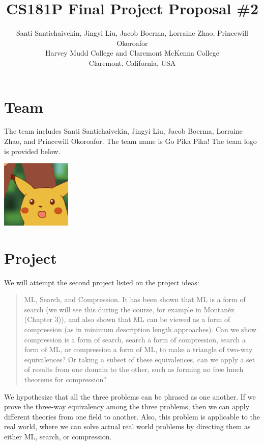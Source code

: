 \documentclass[12pt]{article}
\begin{document}
\title{CS181P Final Project Proposal \#2}

\author{
Santi Santichaivekin, Jingyi Liu, Jacob Boerma, Lorraine Zhao, Princewill Okoroafor\\
Harvey Mudd College and Claremont McKenna College\\
Claremont, California, USA\\
}

\maketitle

\section{Team}
The team includes Santi Santichaivekin,
Jingyi Liu,
Jacob Boerma,
Lorraine Zhao, and 
Princewill Okoroafor.
The team name is Go Pika Pika!
The team logo is provided below.

\includegraphics[width=0.25\textwidth]{Surprised_Pikachu_HD.jpg}

\section{Project}

We will attempt the second project listed on the project ideas:
\begin{quote}
ML, Search, and Compression. It has been shown that ML is a form of search (we will see this during the course, for example in Montan\~ez (Chapter 3)), and also shown that ML can be viewed as a form of compression (as in minimum description length approaches). Can we show compression is a form of search, search a form of compression, search a form of ML, or compression a form of ML, to make a triangle of two-way equivalences? Or taking a subset of these equivalences, can we apply a set of results from one domain to the other, such as forming no free lunch theorems for compression?
\end{quote}
We hypothesize that all the three problems can be phrased as one another. If we prove the three-way equivalency among the three problems, then we can apply different theories from one field to another.
Also, this problem is applicable to the real world, where we can solve actual real world problems by directing them as either ML, search, or compression. 
\end{document}
